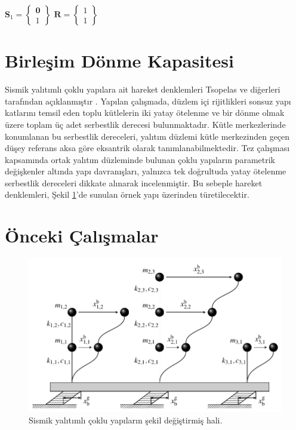 \begin{center}
$\mathbf{S}_{\text{1}}=\begin{Bmatrix}\mathbf{0}\\
1
\end{Bmatrix}$ \hspace{0.2cm} $\mathbf{R}=\begin{Bmatrix}1\\
1
\end{Bmatrix}$ 
\par\end{center}

\newpage{}

\section{Birleşim Dönme Kapasitesi}

Sismik yalıtımlı çoklu yapılara ait hareket denklemleri Tsopelas ve
diğerleri tarafından açıklanmıştır \cite{TSOPELAS199447}. Yapılan
çalışmada, düzlem içi rijitlikleri sonsuz yapı katlarını temsil eden
toplu kütlelerin iki yatay ötelenme ve bir dönme olmak üzere toplam
üç adet serbestlik derecesi bulunmaktadır. Kütle merkezlerinde konumlanan
bu serbestlik dereceleri, yalıtım düzlemi kütle merkezinden geçen
düşey referans aksa göre eksantrik olarak tanımlanabilmektedir. Tez
çalışması kapsamında ortak yalıtım düzleminde bulunan çoklu yapıların
parametrik değişkenler altında yapı davranışları, yalnızca tek doğrultuda
yatay ötelenme serbestlik dereceleri dikkate alınarak incelenmiştir.
Bu sebeple hareket denklemleri, Şekil \ref{fig:multistructure}'de
sunulan örnek yapı üzerinden türetilecektir.

\section{Önceki Çalışmalar}

\begin{figure}[h]
\centering{}\includegraphics[width=1\linewidth]{TikZ/MultiStructure}
\caption{\label{fig:multistructure}Sismik yalıtımlı çoklu yapıların şekil
değiştirmiş hali.}
\end{figure}

